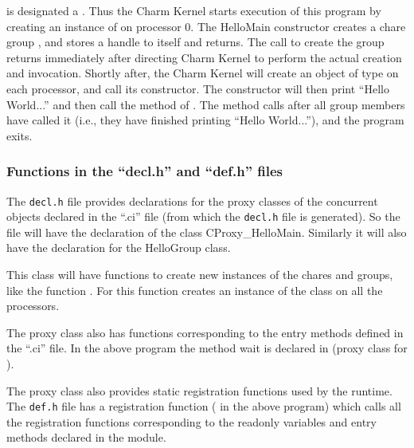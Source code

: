  is designated a . Thus the Charm Kernel starts
execution of this program by creating an instance of  on
processor 0. The HelloMain constructor creates a chare group
, and stores a handle to itself and returns. The call to
create the group returns immediately after directing Charm Kernel to perform
the actual creation and invocation.  Shortly after, the Charm Kernel will
create an object of type  on each processor, and call its
constructor. The constructor will then print ``Hello World...'' and then
call the  method of . The  method
calls  after all group members have called it (i.e., they have
finished printing ``Hello World...''), and the \charmpp program exits.

\subsubsection{Functions in the ``decl.h'' and ``def.h'' files}

The \texttt{decl.h} file provides declarations for the proxy classes of the
concurrent objects declared in the ``.ci'' file (from which the \texttt{decl.h}
file is generated). So the  file will have the declaration of
the class CProxy\_HelloMain. Similarly it will also have the declaration for
the HelloGroup class. 

This class will have functions to create new instances of the chares and
groups, like the function . For  this function creates
an instance of the class  on all the processors. 

The proxy class also has functions corresponding to the entry methods defined
in the ``.ci'' file. In the above program the method wait is declared in
 (proxy class for ).

The proxy class also provides static registration functions used by the
\charmpp{} runtime.  The \texttt{def.h} file has a registration function
( in the above program) which calls all the registration
functions corresponding to the readonly variables and entry methods declared in
the module.

